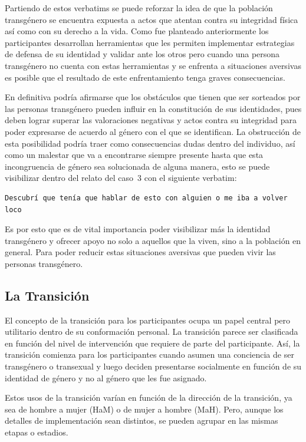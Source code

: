 Partiendo de estos verbatims se puede reforzar la idea de que la población
transgénero se encuentra expuesta a actos que atentan contra su integridad
física así como con su derecho a la vida. Como fue planteado anteriormente los
participantes desarrollan herramientas que les permiten implementar estrategias
de defensa de su identidad y validar ante los otros pero cuando una persona
transgénero no cuenta con estas herramientas y se enfrenta a situaciones
aversivas es posible que el resultado de este enfrentamiento tenga graves
consecuencias.

En definitiva podría afirmarse que los obstáculos que tienen que ser sorteados
por las personas transgénero pueden influir en la constitución de sus
identidades, pues deben lograr superar las valoraciones negativas y actos contra
su integridad para poder expresarse de acuerdo al género con el que se
identifican. La obstrucción de esta posibilidad podría traer como consecuencias
dudas dentro del individuo, así como un malestar que va a encontrarse siempre
presente hasta que esta incongruencia de género sea solucionada de alguna
manera, esto se puede visibilizar dentro del relato del caso~3 con el siguiente
verbatim:

\begin{verbatim}
Descubrí que tenía que hablar de esto con alguien o me iba a volver loco
\end{verbatim}

Es por esto que es de vital importancia poder visibilizar más la identidad
transgénero y ofrecer apoyo no solo a aquellos que la viven, sino a la población
en general. Para poder reducir estas situaciones aversivas que pueden vivir las
personas transgénero.



\subsection{La Transición}\label{ssec:transicion}

El concepto de la transición para los participantes ocupa un papel central pero
utilitario dentro de su conformación personal. La transición parece ser
clasificada en función del nivel de intervención que requiere de parte del
participante. Así, la transición comienza para los participantes cuando asumen
una conciencia de ser transgénero o transexual y luego deciden presentarse
socialmente en función de su identidad de género y no al género que les fue
asignado.

Estos usos de la transición varían en función de la dirección de la transición,
ya sea de hombre a mujer (HaM) o de mujer a hombre (MaH). Pero, aunque los
detalles de implementación sean distintos, se pueden agrupar en las mismas
etapas o estadios.


